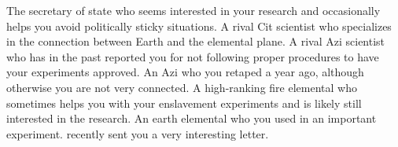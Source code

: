 \documentclass[char]{elementals}
\begin{document}
\begin{contacts}
  \contact{\cDema{}} The secretary of state who seems interested in your research and occasionally helps you avoid politically sticky situations.
	\contact{\cGD{}} A rival Cit scientist who specializes in the connection between Earth and the elemental plane.
	\contact{\cScientist{}} A rival Azi scientist who has in the past reported you for not following proper procedures to have your experiments approved.
	\contact{\cDiplomat{}} An Azi who you retaped a year ago, although otherwise you are not very connected.
	\contact{\cPyro{}} A high-ranking fire elemental who sometimes helps you with your enslavement experiments and is likely still interested in the research.
	\contact{\cMinion{}} An earth elemental who you used in an important experiment. \cMinion{\They} recently sent you a very interesting letter.
\end{contacts}
\end{document}
